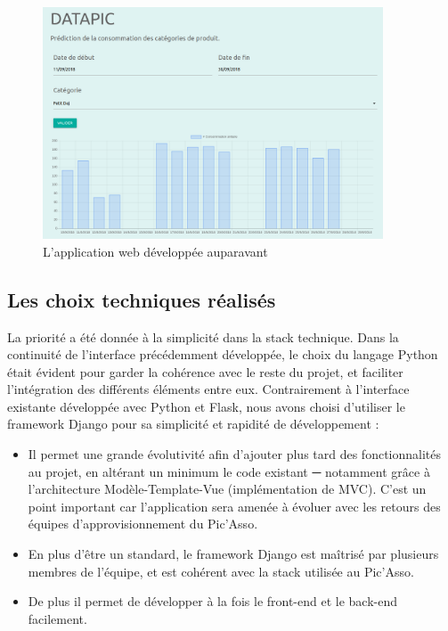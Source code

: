 \begin{figure}[ht]
    \centering
    \includegraphics[width=0.9\textwidth]{figures/4_interface/flask.png}
    \caption{L'application web développée auparavant}
    \label{fig:flask_interface}
\end{figure}


\subsection{Les choix techniques réalisés}
\label{subsec:ui_techs}

La priorité a été donnée à la simplicité dans la stack technique. Dans la continuité de l’interface précédemment développée, le choix du langage Python était évident pour garder la cohérence avec le reste du projet, et faciliter l’intégration des différents éléments entre eux. Contrairement à l’interface existante développée avec Python et Flask, nous avons choisi d’utiliser le framework Django pour sa simplicité et rapidité de développement :
\begin{itemize}
    \item Il permet une grande évolutivité afin d’ajouter plus tard des fonctionnalités au projet, en altérant un minimum le code existant ─ notamment grâce à l’architecture Modèle-Template-Vue (implémentation de MVC). C’est un point important car l’application sera amenée à évoluer avec les retours des équipes d'approvisionnement du Pic'Asso.
    \item En plus d’être un standard, le framework Django est maîtrisé par plusieurs membres de l’équipe, et est cohérent avec la stack utilisée au Pic’Asso.
    \item De plus il permet de développer à la fois le front-end et le back-end facilement.
\end{itemize}


